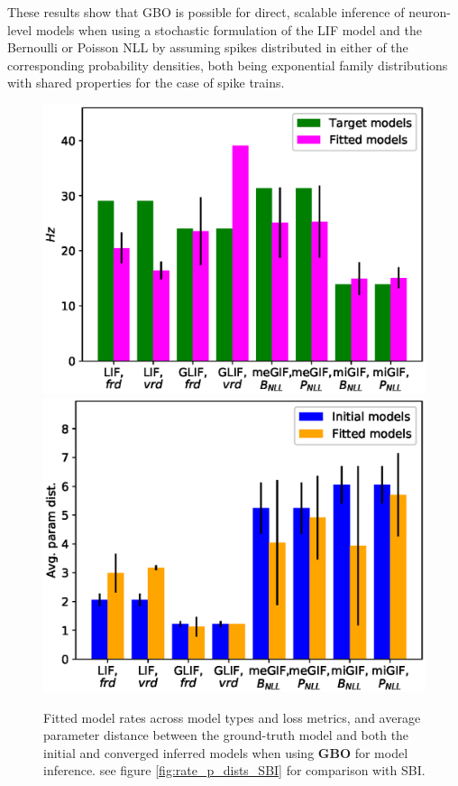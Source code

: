 \documentclass[mphil,deptreport,ianc]{infthesis} %
\begin{document}
These results show that GBO is possible for direct, scalable inference of neuron-level models when using a stochastic formulation of the LIF model and the Bernoulli or Poisson NLL by assuming spikes distributed in either of the corresponding probability densities, both being exponential family distributions with shared properties for the case of spike trains.


\begin{figure}
    \centering
	\includegraphics[width=0.49\columnwidth]{figures/export_rates_saved_all.eps}
	\includegraphics[width=0.49\columnwidth]{figures/export_p_dists_saved_all.eps}
	\caption{Fitted model rates across model types and loss metrics, and average parameter distance between the ground-truth model and both the initial and converged inferred models when using \textbf{GBO} for model inference. see figure \ref{fig:rate_p_dists_SBI} for comparison with SBI.}
	\label{fig:rate_p_dists_GBO}
\end{figure}
\end{document}
